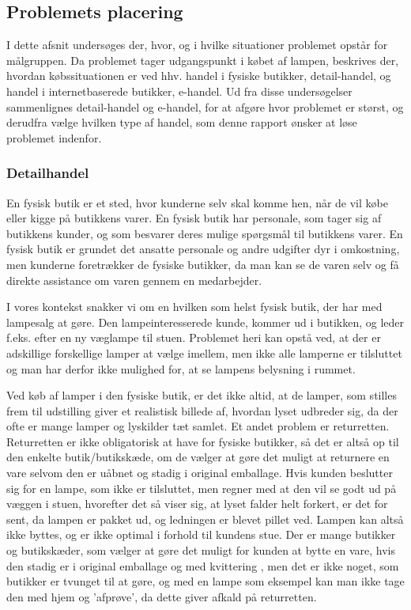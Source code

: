 \subsection{Problemets placering}
I dette afsnit undersøges der, hvor, og i hvilke situationer problemet opstår for målgruppen. Da problemet tager udgangspunkt i købet af lampen, beskrives der, hvordan købssituationen er ved hhv. handel i fysiske butikker, detail-handel, og handel i internetbaserede butikker, e-handel. Ud fra disse undersøgelser sammenlignes detail-handel og e-handel, for at afgøre hvor problemet er størst, og derudfra vælge hvilken type af handel, som denne rapport ønsker at løse problemet indenfor.

\subsubsection{Detailhandel}
En fysisk butik er et sted, hvor kunderne selv skal komme hen, når de vil købe eller kigge på butikkens varer. En fysisk butik har personale, som tager sig af butikkens kunder, og som besvarer deres mulige spørgsmål til butikkens varer. En fysisk butik er grundet det ansatte personale og andre udgifter dyr i omkostning, men kunderne foretrækker de fysiske butikker, da man kan se de varen selv og få direkte assistance om varen gennem en medarbejder\cite{fysisk_kontra_online}.

I vores kontekst snakker vi om en hvilken som helst fysisk butik, der har med lampesalg at gøre. Den lampeinteresserede kunde, kommer ud i butikken, og leder f.eks. efter en ny væglampe til stuen. Problemet heri kan opstå ved, at der er adskillige forskellige lamper at vælge imellem, men ikke alle lamperne er tilsluttet og man har derfor ikke mulighed for, at se lampens belysning i rummet.

Ved køb af lamper i den fysiske butik, er det ikke altid, at de lamper, som stilles frem til udstilling giver et realistisk billede af, hvordan lyset udbreder sig, da der ofte er mange lamper og lyskilder tæt samlet. Et andet problem er returretten. Returretten er ikke obligatorisk at have for fysiske butikker, så det er altså op til den enkelte butik/butikskæde, om de vælger at gøre det muligt at returnere en vare selvom den er uåbnet og stadig i original emballage\cite{fortrydelsesret}. Hvis kunden beslutter sig for en lampe, som ikke er tilsluttet, men regner med at den vil se godt ud på væggen i stuen, hvorefter det så viser sig, at lyset falder helt forkert, er det for sent, da lampen er pakket ud, og ledningen er blevet pillet ved. Lampen kan altså ikke byttes, og er ikke optimal i forhold til kundens stue. Der er mange butikker og butikskæder, som vælger at gøre det muligt for kunden at bytte en vare, hvis den stadig er i original emballage og med kvittering \cite{ikea_returret}, men det er ikke noget, som butikker er tvunget til at gøre, og med en lampe som eksempel kan man ikke tage den med hjem og ’afprøve’, da dette giver afkald på returretten.

